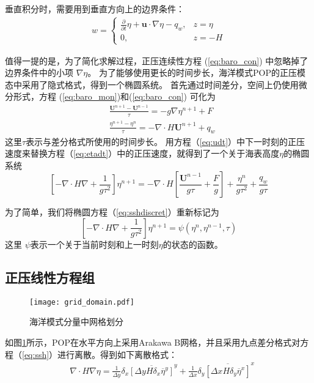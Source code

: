 垂直积分时，需要用到垂直方向上的边界条件：
\begin{align}
\label{eq:bound_w}
w = \left\{ \begin{array}{ll}
\frac{\partial}{\partial t} \eta  +\textbf{u}\cdot\nabla \eta - q_w, & z = \eta  \\
0, & z = -H
\end{array} \right.
\end{align}
 
值得一提的是，为了简化求解过程，正压连续性方程 (\ref{eq:baro_con}) 中忽略掉了边界条件中的小项 $\nabla \eta$\cite{smith2010parallel}。
为了能够使用更长的时间步长，海洋模式POP的正压模态中采用了隐式格式，得到一个椭圆系统。 
首先通过时间差分，空间上仍使用微分形式，方程  (\ref{eq:baro_mon})和(\ref{eq:baro_con}) 可化为
\begin{align}
&\displaystyle \frac{ \textbf{U}^{n+1} - \textbf{U}^{n-1}}{\tau}  = -g \nabla \eta^{n+1} + F \label{eq:udt} \\
&\displaystyle \frac{\eta^{n+1} - \eta^n }{\tau}  = - \nabla \cdot H\textbf{U} ^{n+1}+ q_w \label{eq:etadt}
\end{align}
这里$\tau$表示与差分格式所使用的时间步长。 
用方程（\ref{eq:udt}）中下一时刻的正压速度来替换方程（\ref{eq:etadt}）中的正压速度，就得到了一个关于海表高度$\eta$的椭圆系统
\begin{equation}
\label{eq:sshdiscret}
     [-\nabla\cdot H \nabla + \frac{1}{g  \tau^2}]\eta^{n+1}
           = -\nabla\cdot H[\frac{\textbf{U}^{n-1}}{g \tau} + \frac{F}{g}] + \frac{\eta^n}{g\tau^2} +\frac{q_w}{g\tau}
\end{equation}
 
为了简单，我们将椭圆方程（\ref{eq:sshdiscret}）重新标记为
\begin{equation}
\label{eq:ssh}
[-\nabla \cdot H\nabla +\frac{1}{g  \tau^2}]\eta^{n+1} = \psi(\eta^n,\eta^{n-1},\tau)
\end{equation}
这里 $\psi$表示一个关于当前时刻和上一时刻$\eta$的状态的函数。
 

\subsection{正压线性方程组}
\label{solver:baroproperty}
\begin{figure}%
\centering
\texttt{[image: grid\_domain.pdf]}
\caption[] {海洋模式分量中网格划分\label{fig:grid1}}
\end{figure}

如图\ref{fig:grid1}所示，POP在水平方向上采用Arakawa B网格\cite{smith2010parallel}，并且采用九点差分格式对方程（\ref{eq:ssh}）进行离散。得到如下离散格式：
\begin{align}
    & \nabla\cdot H \nabla \eta  =\frac{1}{\Delta y}\delta_x \overline{[\Delta y H  \delta_x\overline{\eta}^y]}^y +\frac{1}{\Delta x}\delta_y \overline{[\Delta x H  \delta_y\overline{\eta}^x]}^x \label{eq:nabla2}
  \end{align}

